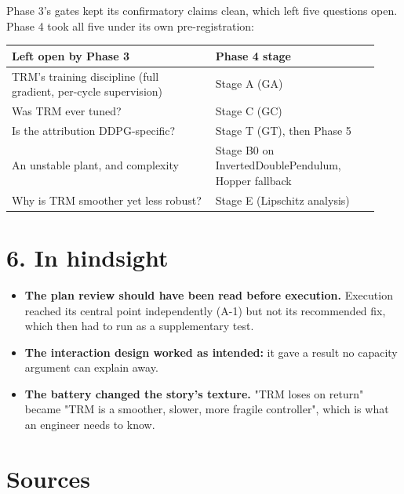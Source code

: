 \documentclass[11pt]{article}
\begin{document}
Phase 3's gates kept its confirmatory claims clean, which left five questions open. Phase 4 took all five under its own pre-registration:



\begin{center}\small\begin{tabular}{>{\raggedright\arraybackslash}p{0.517\linewidth}>{\raggedright\arraybackslash}p{0.417\linewidth}}
\toprule
Left open by Phase 3 & Phase 4 stage \\
\midrule
TRM's training discipline (full gradient, per-cycle supervision) & Stage A (GA) \\
Was TRM ever tuned? & Stage C (GC) \\
Is the attribution DDPG-specific? & Stage T (GT), then Phase 5 \\
An unstable plant, and complexity & Stage B0 on InvertedDoublePendulum, Hopper fallback \\
Why is TRM smoother yet less robust? & Stage E (Lipschitz analysis) \\
\bottomrule
\end{tabular}\end{center}



\section*{6. In hindsight}



\begin{itemize}
\item \textbf{The plan review should have been read before execution.} Execution reached its central point independently (A-1) but not its recommended fix, which then had to run as a supplementary test.
\item \textbf{The interaction design worked as intended:} it gave a result no capacity argument can explain away.
\item \textbf{The battery changed the story's texture.} "TRM loses on return" became "TRM is a smoother, slower, more fragile controller", which is what an engineer needs to know.
\end{itemize}



\section*{Sources}
\end{document}
